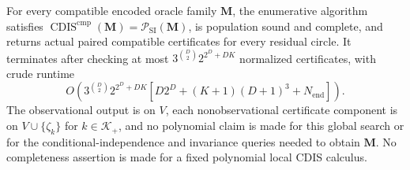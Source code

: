 For every compatible encoded oracle family \(\mathbf M\), the enumerative algorithm satisfies \(\operatorname{CDIS}^{\mathrm{cmp}}(\mathbf M)=\mathcal P_{\mathrm{SI}}(\mathbf M)\), is population sound and complete, and returns actual paired compatible certificates for every residual circle.  It terminates after checking at most \(3^{\binom D2}2^{2^D+DK}\) normalized certificates, with crude runtime
\[
O\!\left(3^{\binom D2}2^{2^D+DK}
\left[D2^D+(K+1)(D+1)^3+N_{\mathrm{end}}\right]\right).
\]
The observational output is on \(V\), each nonobservational certificate component is on \(V\cup\{\zeta_k\}\) for \(k\in\mathcal K_+\), and no polynomial claim is made for this global search or for the conditional-independence and invariance queries needed to obtain \(\mathbf M\).  No completeness assertion is made for a fixed polynomial local CDIS calculus.